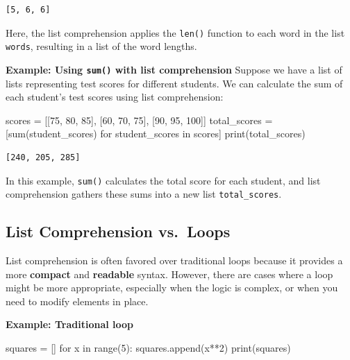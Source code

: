 \documentclass[
  letterpaper,
  DIV=11,
  numbers=noendperiod]{scrreprt}
\newenvironment{Shaded}{\begin{snugshade}}{\end{snugshade}}
\newcommand{\BuiltInTok}[1]{\textcolor[rgb]{0.00,0.23,0.31}{#1}}
\newcommand{\ControlFlowTok}[1]{\textcolor[rgb]{0.00,0.23,0.31}{#1}}
\newcommand{\DecValTok}[1]{\textcolor[rgb]{0.68,0.00,0.00}{#1}}
\newcommand{\KeywordTok}[1]{\textcolor[rgb]{0.00,0.23,0.31}{#1}}
\newcommand{\NormalTok}[1]{\textcolor[rgb]{0.00,0.23,0.31}{#1}}
\newcommand{\OperatorTok}[1]{\textcolor[rgb]{0.37,0.37,0.37}{#1}}
\begin{document}
\begin{verbatim}
[5, 6, 6]
\end{verbatim}

Here, the list comprehension applies the \texttt{len()} function to each
word in the list \texttt{words}, resulting in a list of the word
lengths.

\textbf{Example: Using \texttt{sum()} with list comprehension} Suppose
we have a list of lists representing test scores for different students.
We can calculate the sum of each student's test scores using list
comprehension:

\begin{Shaded}
\begin{Highlighting}[]
\NormalTok{scores }\OperatorTok{=}\NormalTok{ [[}\DecValTok{75}\NormalTok{, }\DecValTok{80}\NormalTok{, }\DecValTok{85}\NormalTok{], [}\DecValTok{60}\NormalTok{, }\DecValTok{70}\NormalTok{, }\DecValTok{75}\NormalTok{], [}\DecValTok{90}\NormalTok{, }\DecValTok{95}\NormalTok{, }\DecValTok{100}\NormalTok{]]}
\NormalTok{total\_scores }\OperatorTok{=}\NormalTok{ [}\BuiltInTok{sum}\NormalTok{(student\_scores) }\ControlFlowTok{for}\NormalTok{ student\_scores }\KeywordTok{in}\NormalTok{ scores]}
\BuiltInTok{print}\NormalTok{(total\_scores) }
\end{Highlighting}
\end{Shaded}

\begin{verbatim}
[240, 205, 285]
\end{verbatim}

In this example, \texttt{sum()} calculates the total score for each
student, and list comprehension gathers these sums into a new list
\texttt{total\_scores}.

\hypertarget{list-comprehension-vs.-loops}{%
\subsection{List Comprehension
vs.~Loops}\label{list-comprehension-vs.-loops}}

List comprehension is often favored over traditional loops because it
provides a more \textbf{compact} and \textbf{readable} syntax. However,
there are cases where a loop might be more appropriate, especially when
the logic is complex, or when you need to modify elements in place.

\textbf{Example: Traditional loop}

\begin{Shaded}
\begin{Highlighting}[]
\NormalTok{squares }\OperatorTok{=}\NormalTok{ []}
\ControlFlowTok{for}\NormalTok{ x }\KeywordTok{in} \BuiltInTok{range}\NormalTok{(}\DecValTok{5}\NormalTok{):}
\NormalTok{    squares.append(x}\OperatorTok{**}\DecValTok{2}\NormalTok{)}
\BuiltInTok{print}\NormalTok{(squares) }
\end{Highlighting}
\end{Shaded}
\end{document}
